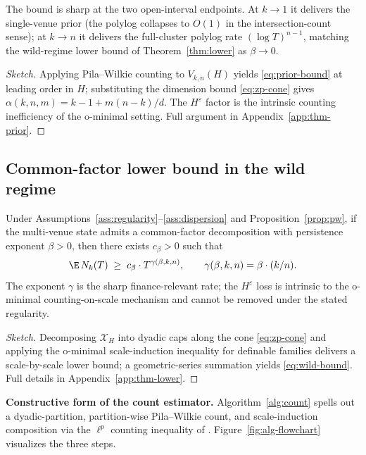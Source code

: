 The bound is sharp at the two open-interval endpoints. At $k \to 1$
it delivers the single-venue prior (the polylog collapses to $O(1)$
in the intersection-count sense); at $k \to n$ it delivers the
full-cluster polylog rate $(\log T)^{n-1}$, matching the wild-regime
lower bound of Theorem~\ref{thm:lower} as $\beta \to 0$.

\begin{proof}[Sketch]
Applying Pila--Wilkie counting \citep{PilaWilkie2006,
Pila2011ManinMumford} to $V_{k,n}(H)$ yields \eqref{eq:prior-bound}
at leading order in $H$; substituting the dimension bound
\eqref{eq:zp-cone} gives $\alpha(k,n,m) = k-1 + m(n-k)/d$. The
$H^\varepsilon$ factor is the intrinsic counting inefficiency of
the o-minimal setting. Full argument in
Appendix~\ref{app:thm-prior}.
\end{proof}

\subsection{Common-factor lower bound in the wild regime}
\label{sec:thm-lower}

\begin{theorem}\label{thm:lower}
Under Assumptions~\ref{ass:regularity}--\ref{ass:dispersion} and
Proposition~\ref{prop:pw}, if the multi-venue state admits a
common-factor decomposition with persistence exponent $\beta > 0$,
then there exists $c_\beta > 0$ such that
\begin{equation}\label{eq:wild-bound}
\E\,N_k(T) \;\ge\; c_\beta \cdot T^{\gamma(\beta,k,n)},
\qquad \gamma(\beta,k,n) = \beta \cdot (k/n).
\end{equation}
The exponent $\gamma$ is the sharp finance-relevant rate; the
$H^\varepsilon$ loss is intrinsic to the o-minimal
counting-on-scale mechanism and cannot be removed under the stated
regularity.
\end{theorem}

\begin{proof}[Sketch]
Decomposing $\mathcal{X}_H$ into dyadic caps along the cone
\eqref{eq:zp-cone} and applying the o-minimal scale-induction
inequality for definable families
\citep{PeterzilStarchenko2009, BakkerKlinglerTsimerman2020}
delivers a scale-by-scale lower bound; a geometric-series
summation yields \eqref{eq:wild-bound}. Full details in
Appendix~\ref{app:thm-lower}.
\end{proof}

\textbf{Constructive form of the count estimator.}
Algorithm~\ref{alg:count} spells out a dyadic-partition,
partition-wise Pila--Wilkie count, and scale-induction composition
via the $\ell^p$ counting inequality of \citet{PilaWilkie2006}.
Figure~\ref{fig:alg-flowchart} visualizes the three steps.

